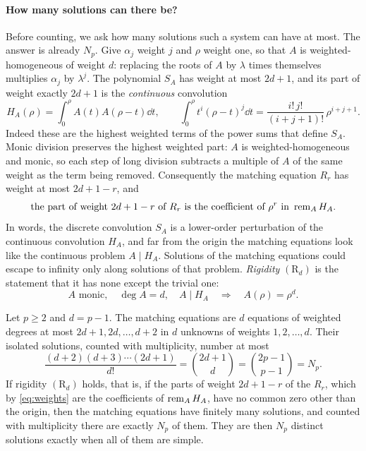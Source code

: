 \paragraph{How many solutions can there be?}
Before counting, we ask how many solutions such a system can have at
most. The answer is already \(N_p\). Give \(\alpha_j\) weight \(j\) and
\(\rho\) weight one, so that \(A\) is weighted-homogeneous of weight
\(d\): replacing the roots of \(A\) by \(\lambda\) times themselves
multiplies \(\alpha_j\) by \(\lambda^j\). The polynomial \(S_A\) has
weight at most \(2d+1\), and its part of weight exactly \(2d+1\) is the
\emph{continuous} convolution
\begin{equation}\label{eq:continuous}
 H_A(\rho)=\int_0^\rho A(t)A(\rho-t)\dd t,\qquad
 \int_0^\rho t^i(\rho-t)^j\dd t=\frac{i!\,j!}{(i+j+1)!}\,\rho^{i+j+1}.
\end{equation}
Indeed these are the highest weighted terms of the power sums that
define \(S_A\). Monic division preserves the highest weighted part:
\(A\) is weighted-homogeneous and monic, so each step of long division
subtracts a multiple of \(A\) of the same weight as the term being
removed. Consequently the matching equation \(R_r\) has weight at most
\(2d+1-r\), and
\begin{equation}\label{eq:weights}
 \text{the part of weight }2d+1-r\text{ of }R_r
 \text{ is the coefficient of }\rho^r\text{ in }\operatorname{rem}_{A} H_A .
\end{equation}
In words, the discrete convolution \(S_A\) is a lower-order perturbation
of the continuous convolution \(H_A\), and far from the origin the
matching equations look like the continuous problem \(A\mid H_A\).
Solutions of the matching equations could escape to infinity only along
solutions of that problem. \emph{Rigidity} \((\mathrm R_d)\) is the
statement that it has none except the trivial one:
\begin{equation}\label{eq:rigidity}
 A\text{ monic},\quad\deg A=d,\quad A\mid H_A
 \quad\Longrightarrow\quad A(\rho)=\rho^d.
\end{equation}

\begin{proposition}\label{prop:bezout}
Let \(p\ge2\) and \(d=p-1\). The matching equations are \(d\) equations
of weighted degrees at most \(2d+1,2d,\ldots,d+2\) in \(d\) unknowns of
weights \(1,2,\ldots,d\). Their isolated solutions, counted with
multiplicity, number at most
\[
 \frac{(d+2)(d+3)\cdots(2d+1)}{d!}=\binom{2d+1}{d}
 =\binom{2p-1}{p-1}=N_p .
\]
If rigidity \((\mathrm R_d)\) holds, that is, if the parts of weight
\(2d+1-r\) of the \(R_r\), which by \eqref{eq:weights} are the
coefficients of \(\operatorname{rem}_{A} H_A\), have no common zero other than the
origin, then the matching equations have finitely many solutions, and
counted with multiplicity there are exactly \(N_p\) of them. They are
then \(N_p\) distinct solutions exactly when all of them are simple.
\end{proposition}

